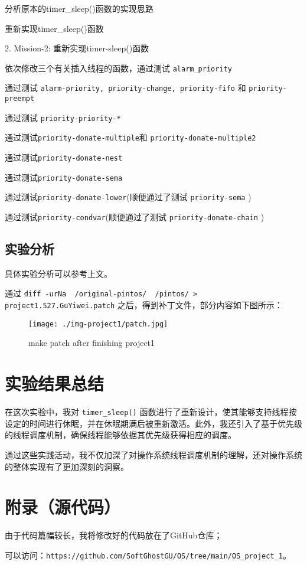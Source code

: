 \documentclass{article}
\begin{document}
	\setlength{\parindent}{4em}
	
	分析原本的timer\_sleep()函数的实现思路
	
	重新实现timer\_sleep()函数
	
	\setlength{\parindent}{2em}
	
	2. Mission-2: 重新实现timer-sleep()函数
	
	\setlength{\parindent}{4em}
	
	依次修改三个有关插入线程的函数，通过测试 \texttt{alarm\_priority}
	
	通过测试 \texttt{alarm-priority, priority-change, priority-fifo} 和 \texttt{priority-preempt}
	
	通过测试 \texttt{priority-priority-*}
	
	通过测试\texttt{priority-donate-multiple}和 \texttt{priority-donate-multiple2}
	
	通过测试\texttt{priority-donate-nest}
	
	通过测试\texttt{priority-donate-sema}
	
	通过测试\texttt{priority-donate-lower}(顺便通过了测试 \texttt{priority-sema} )
	
	通过测试\texttt{priority-condvar}(顺便通过了测试 \texttt{priority-donate-chain} )
	
	\setlength{\parindent}{2em}
	
	\subsection{实验分析}
	
	具体实验分析可以参考上文。
	
	通过 \texttt{diff -urNa ~/original-pintos/  ~/pintos/  >  project1.527.GuYiwei.patch} 之后，得到补丁文件，部分内容如下图所示：
	
	\begin{figure}[htbp]
		\centering
		\texttt{[image: ./img-project1/patch.jpg]}
		\caption{make patch after finishing project1}
		\label{fig:graph3}
	\end{figure}
	
	\section{实验结果总结}
	
	在这次实验中，我对 \texttt{timer\_sleep()} 函数进行了重新设计，使其能够支持线程按设定的时间进行休眠，并在休眠期满后被重新激活。此外，我还引入了基于优先级的线程调度机制，确保线程能够依据其优先级获得相应的调度。
	
	通过这些实践活动，我不仅加深了对操作系统线程调度机制的理解，还对操作系统的整体实现有了更加深刻的洞察。
	
	\section{附录（源代码）}
	
	由于代码篇幅较长，我将修改好的代码放在了GitHub仓库；
	
	可以访问：\texttt{https://github.com/SoftGhostGU/OS/tree/main/OS\_project\_1}。
	
\end{document}

